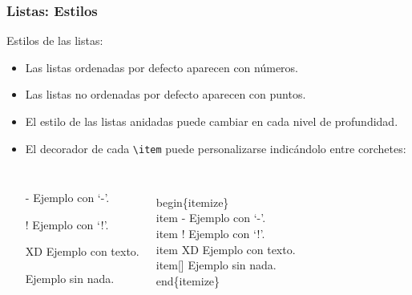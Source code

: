 \begin{frame}[fragile]
\frametitle{Listas: Estilos}
Estilos de las listas:
\begin{itemize}
    \item Las listas ordenadas por defecto aparecen con números.
    \item Las listas no ordenadas por defecto aparecen con puntos.
    \item El estilo de las listas anidadas puede cambiar en cada nivel de profundidad.
    \item El decorador de cada \verb|\item| puede personalizarse indicándolo entre corchetes:
\end{itemize}

\begin{columns}

\begin{itemize}
    \item[-] Ejemplo con `-'.
    \item[!] Ejemplo con `!'.
    \item[XD] Ejemplo con texto.
    \item[] Ejemplo sin nada.
\end{itemize}

\begin{semiverbatim}
\\begin\{itemize\}
    \\item[-] Ejemplo con `-'.
    \\item[!] Ejemplo con `!'.
    \\item[XD] Ejemplo con texto.
    \\item[] Ejemplo sin nada.
\\end\{itemize\}
\end{semiverbatim}
\end{columns}

\end{frame}
